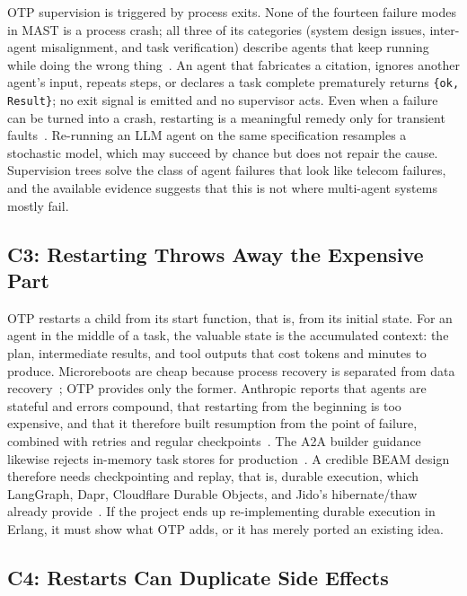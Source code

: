 \documentclass[conference,letterpaper]{IEEEtran}
\newcommand{\code}[1]{\texttt{#1}}
\begin{document}
OTP supervision is triggered by process exits. None of the fourteen failure
modes in MAST is a process crash; all three of its categories (system design
issues, inter-agent misalignment, and task verification) describe agents
that keep running while doing the wrong thing~\cite{cemri2025}. An agent
that fabricates a citation, ignores another agent's input, repeats steps, or
declares a task complete prematurely returns \code{\{ok, Result\}}; no exit
signal is emitted and no supervisor acts. Even when a failure can be turned
into a crash, restarting is a meaningful remedy only for transient
faults~\cite{gray1985}. Re-running an LLM agent on the same specification
resamples a stochastic model, which may succeed by chance but does not
repair the cause. Supervision trees solve the class of agent failures that
look like telecom failures, and the available evidence suggests that this
is not where multi-agent systems mostly fail.

\subsection{C3: Restarting Throws Away the Expensive Part}

OTP restarts a child from its start function, that is, from its initial
state. For an agent in the middle of a task, the valuable state is the
accumulated context: the plan, intermediate results, and tool outputs that
cost tokens and minutes to produce. Microreboots are cheap because process
recovery is separated from data recovery~\cite{candea2004}; OTP provides only
the former. Anthropic reports that agents are stateful and errors compound,
that restarting from the beginning is too expensive, and that it therefore
built resumption from the point of failure, combined with retries and
regular checkpoints~\cite{anthropic2025}. The A2A builder guidance likewise
rejects in-memory task stores for production~\cite{aaif2026}. A credible
BEAM design therefore needs checkpointing and replay, that is, durable
execution, which LangGraph, Dapr, Cloudflare Durable Objects, and Jido's
hibernate/thaw already
provide~\cite{langgraph-durable,dapr-docs,cloudflare-agents,jido-storage}.
If the project ends up re-implementing durable execution in Erlang, it must
show what OTP adds, or it has merely ported an existing idea.

\subsection{C4: Restarts Can Duplicate Side Effects}
\end{document}
